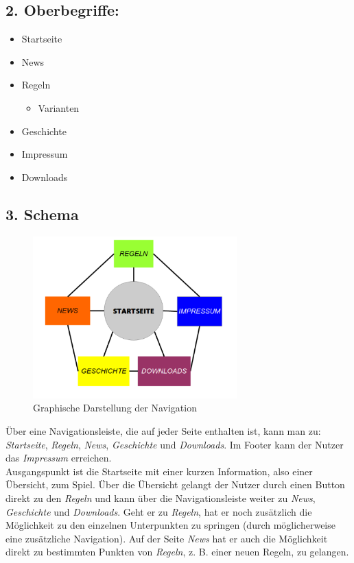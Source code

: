 \documentclass{scrartcl}
\begin{document}
\subsection*{2. Oberbegriffe:}  
 \begin{itemize}
 \item Startseite
 \item News
 \item Regeln
 \begin{itemize}
 \item Varianten
 \end{itemize}
 \item Geschichte
 \item Impressum
 \item Downloads
 \end{itemize}
 \subsection*{3. Schema}
 \begin{figure}[H]
 \centering
 \includegraphics[width=0.7\textwidth]{schema.png}
\caption{Graphische Darstellung der Navigation}
\end{figure} 
Über eine Navigationsleiste, die auf jeder Seite enthalten ist, kann man zu: \textit{Startseite}, \textit{Regeln}, \textit{News}, \textit{Geschichte} und \textit{Downloads}. Im Footer kann der Nutzer das  \textit{Impressum} erreichen.\\
 Ausgangspunkt ist die Startseite mit einer kurzen Information, also einer Übersicht, zum Spiel. Über die Übersicht gelangt der Nutzer durch einen Button direkt zu den \textit{Regeln} und kann über die Navigationsleiste weiter zu \textit{News}, \textit{Geschichte} und \textit{Downloads}. 
 Geht er zu \textit{Regeln}, hat er noch zusätzlich die Möglichkeit zu den einzelnen Unterpunkten zu springen (durch möglicherweise eine zusätzliche Navigation). Auf der Seite \textit{News} hat er auch die Möglichkeit direkt zu bestimmten Punkten von \textit{Regeln}, z. B. einer neuen Regeln, zu gelangen.
\end{document}
